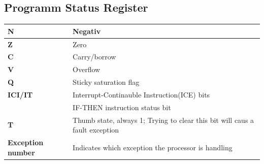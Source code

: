 \subsection{Programm Status Register}
\renewcommand{\arraystretch}{1.2}
\begin{minipage}{\linewidth}
    \begin{tabular}{|l|l|}
        \hline 
        \textbf{N}& Negativ \\ 
        \hline 
        \textbf{Z}& Zero  \\ 
        \hline 
        \textbf{C}& Carry/borrow  \\ 
        \hline 
        \textbf{V}& Overflow \\ 
        \hline 
        \textbf{Q}& Sticky saturation flag \\ 
        \hline 
        \textbf{ICI/IT}& Interrupt-Continauble Instruction(ICE) bits\\
                        & IF-THEN instruction status bit \\ 
        \hline 
        \textbf{T}& Thumb state, always 1; Trying to clear this bit will caus a fault exception \\ 
        \hline 
        \textbf{Exception number}& Indicates which exception the processor is handling \\ 
        \hline 
    \end{tabular} 
\end{minipage}

